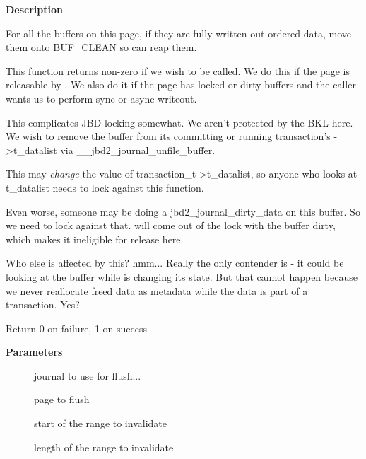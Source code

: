 \documentclass[a4paper,8pt,english]{sphinxmanual}
\begin{document}
\textbf{Description}

For all the buffers on this page,
if they are fully written out ordered data, move them onto BUF\_CLEAN
so  can reap them.

This function returns non-zero if we wish 
to be called. We do this if the page is releasable by .
We also do it if the page has locked or dirty buffers and the caller wants
us to perform sync or async writeout.

This complicates JBD locking somewhat.  We aren't protected by the
BKL here.  We wish to remove the buffer from its committing or
running transaction's -\textgreater{}t\_datalist via \_\_jbd2\_journal\_unfile\_buffer.

This may \emph{change} the value of transaction\_t-\textgreater{}t\_datalist, so anyone
who looks at t\_datalist needs to lock against this function.

Even worse, someone may be doing a jbd2\_journal\_dirty\_data on this
buffer.  So we need to lock against that.  
will come out of the lock with the buffer dirty, which makes it
ineligible for release here.

Who else is affected by this?  hmm...  Really the only contender
is  - it could be looking at the buffer while
 is changing its state.  But that
cannot happen because we never reallocate freed data as metadata
while the data is part of a transaction.  Yes?

Return 0 on failure, 1 on success

\begin{fulllineitems}
\label{filesystems/index:c.jbd2_journal_invalidatepage}
\end{fulllineitems}


\textbf{Parameters}
\begin{description}
\item[{}] \leavevmode
journal to use for flush...

\item[{}] \leavevmode
page to flush

\item[{}] \leavevmode
start of the range to invalidate

\item[{}] \leavevmode
length of the range to invalidate

\end{description}
\end{document}
